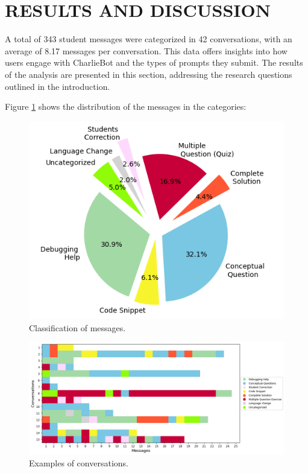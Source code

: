 \documentclass[a4paper,twoside]{article}
\begin{document}
\section{\uppercase{Results and Discussion}}

A total of 343 student messages were categorized in 42 conversations, with
an average of 8.17 messages per conversation. This data offers insights into how
users engage with CharlieBot and the types of prompts they submit. The results of
the analysis are presented in this section, addressing the research questions
outlined in the introduction.

Figure \ref{fig:graph1} shows the distribution of the messages in the
categories:

\begin{figure}[h!]
    \centering
    \includegraphics[scale=0.62]{img/figure1.png}
    \caption{Classification of messages.}
    \label{fig:graph1}
\end{figure}

\begin{figure}[htbp]
  \centering
  \includegraphics[scale=0.52]{img/figure2.png}
  \caption{Examples of conversations.}
  \label{fig:graph2}
\end{figure}
\end{document}
